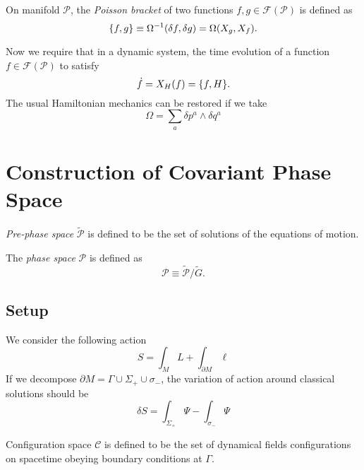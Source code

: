 \documentclass[10pt]{article}
\begin{document}
\begin{definition}
    On manifold $\mathcal{P}$, the \textit{Poisson bracket} of two functions  $f,g\in\mathcal{F}(\mathcal{P})$ is defined as
    \begin{equation}
        \pb{f}{g}\equiv\Omega^{-1}(\delta f,\delta g)=\Omega(X_g,X_f).
    \end{equation}
\end{definition}
Now we require that in a dynamic system, the time evolution of a function $f\in\mathcal{F}(\mathcal{P})$ to satisfy
\begin{equation}
    \dot{f}=X_H(f)=\pb{f}{H}.
\end{equation}
The usual Hamiltonian mechanics can be restored if we take
\begin{equation}
    \Omega=\sum_a \delta p^a\wedge \delta q^a
\end{equation}

\section{Construction of Covariant Phase Space}
\begin{definition}
    \textit{Pre-phase space} $\tilde{\mathcal{P}}$ is defined to be the set of solutions of the equations of motion.
\end{definition}
\begin{definition}
    The \textit{phase space} $\mathcal{P}$ is defined as 
    \begin{equation}
        \mathcal{P}\equiv\tilde{\mathcal{P}}/\tilde{G}.
    \end{equation}
\end{definition}
\subsection{Setup}
We consider the following action
\begin{equation}
    S=\int_M L+\int_{\partial M}\ell\label{eq:action}
\end{equation}
If we decompose $\partial M=\Gamma\cup\Sigma_+\cup\sigma_-$, the variation of action around classical solutions should be
\begin{equation}
    \delta S=\int_{\Sigma_+}\Psi-\int_{\sigma_-}\Psi\label{var_S_1}
\end{equation}
\begin{definition}
    Configuration space $\mathcal{C}$ is defined to be the set of dynamical fields configurations on spacetime obeying boundary conditions at $\Gamma$.
\end{definition}
\end{document}
